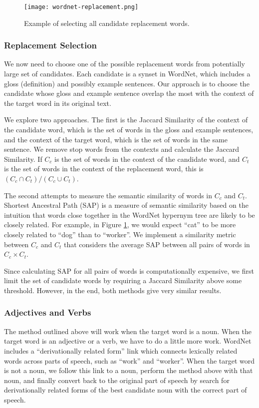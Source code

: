 \documentclass[12pt]{article}
\begin{document}
\begin{figure}[h]
	\centering
	\texttt{[image: wordnet-replacement.png]}
	\caption{Example of selecting all candidate replacement words.}
	\label{fig:wnmapexample}
\end{figure}

\subsubsection{Replacement Selection}

We now need to choose one of the possible replacement words from potentially large set of candidates. Each candidate is a synset in WordNet, which includes a gloss (definition) and possibly example sentences. Our approach is to choose the candidate whose gloss and example sentence overlap the most with the context of the target word in its original text.

We explore two approaches. The first is the Jaccard Similarity of the context of the candidate word, which is the set of words in the gloss and example sentences, and the context of the target word, which is the set of words in the same sentence. We remove stop words from the contexts and calculate the Jaccard Similarity. If $C_c$ is the set of words in the context of the candidate word, and $C_t$ is the set of words in the context of the replacement word, this is $(C_c \cap C_t) / (C_c \cup C_t)$.

The second attempts to measure the semantic similarity of words in $C_c$ and $C_t$. Shortest Ancestral Path (SAP) is a measure of semantic similarity based on the intuition that words close together in the WordNet hypernym tree are likely to be closely related. For example, in Figure \ref{fig:wnmapexample}, we would expect ``cat'' to be more closely related to ``dog'' than to ``worker''. We implement a similarity metric between $C_c$ and $C_t$ that considers the average SAP between all pairs of words in $C_c \times C_t$.

Since calculating SAP for all pairs of words is computationally expensive, we first limit the set of candidate words by requiring a Jaccard Similarity above some threshold. However, in the end, both methods give very similar results.

\subsubsection{Adjectives and Verbs}

The method outlined above will work when the target word is a noun. When the target word is an adjective or a verb, we have to do a little more work. WordNet includes a ``derivationally related form'' link which connects lexically related words across parts of speech, such as ``work'' and ``worker''. When the target word is not a noun, we follow this link to a noun, perform the method above with that noun, and finally convert back to the original part of speech by search for derivationally related forms of the best candidate noun with the correct part of speech.
\end{document}
